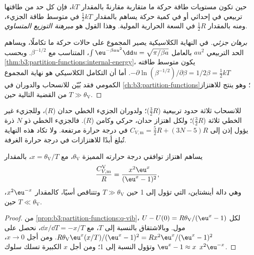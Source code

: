 \begin{theorem}\label{thm:b3:statistical-thermo-applied:equipartition}
حين تكون مستويات طاقة حركة ما متقاربة مقارنةً بالمقدار $kT$، فإن كل
حد من طاقتها تربيعي في إحداثي أو في كمية حركة يساهم بالمقدار
$\frac12kT$ في متوسط طاقة الجزيء، ومنه بالمقدار $\frac12R$ في السعة الحرارية
المولية. وهذا القول هو \emph{مبرهنة التوزيع المتساوي}.
\end{theorem}

\begin{proof}[برهان جزئي]
في النهاية الكلاسيكية يصير المجموع على حالات حركة ما
تكاملًا، ويساهم الحد التربيعي $a u^2$ بالعامل $\int\eu^{-\beta au^2}\dd u =
\sqrt{\pi/\beta a}$، المتناسب مع $\beta^{-1/2}$. وبحسب
\cref{thm:b3:partition-functions:internal-energy}، يكون متوسط طاقته
$-\partial\ln(\beta^{-1/2})/\partial\beta = 1/2\beta = \frac12kT$. أما أن التكامل الكلاسيكي هو
نهاية المجموع الكمومي فقد بُيّن للانسحاب والدوران في
\cref{ch:b3:partition-functions}؛ وهو ينتج للاهتزاز من القضية
التالية حين $T \gg \theta_{\mathrm V}$.
\end{proof}

للانسحاب ثلاثة حدود تربيعية ($\frac32R$)؛ ولدوران الجزيء الخطي
حدان ($R$)، وللجزيء غير الخطي ثلاثة ($\frac32R$)؛ ولكل اهتزاز حدان،
حركي وكامن ($R$). فالجزيء الخطي ذو $N$ ذرة يؤول إذن إلى
$C_{V,\mathrm m} = \frac52R + (3N - 5)R$ في درجة حرارة مرتفعة. ولا تكاد هذه النهاية
تُبلغ أبدًا للاهتزازات في درجة حرارة الغرفة.

\begin{proposition}\label{prop:b3:statistical-thermo-applied:cv-vib}
يساهم اهتزاز توافقي درجة حرارته المميزة $\theta_{\mathrm V}$، مع
$x = \theta_{\mathrm V}/T$، بالمقدار
\[
  \frac{C_{V,\mathrm m}^{\mathrm V}}{R} = \frac{x^2\eu^x}{(\eu^x - 1)^2},
\]
وهي دالة أينشتاين، التي تؤول إلى 1 حين $T \gg \theta_{\mathrm V}$ وتتناقص
أسيًا، كالمقدار $x^2\eu^{-x}$، حين $T \ll \theta_{\mathrm V}$.
\end{proposition}

\begin{proof}
من \cref{prop:b3:partition-functions:q-vib}، $U - U(0) = R\theta_{\mathrm V}/(\eu^x - 1)$ لكل مول.
وبالاشتقاق بالنسبة إلى $T$، مع $\dd x/\dd T = -x/T$، نحصل على
$R\theta_{\mathrm V}\eu^x(x/T)/(\eu^x - 1)^2 = Rx^2\eu^x/(\eu^x - 1)^2$. ومن أجل $x \to 0$، $\eu^x - 1 \approx x$ 
وتؤول النسبة إلى 1؛ ومن أجل $x$ الكبيرة تسلك سلوك $x^2\eu^{-x}$.
\end{proof}

